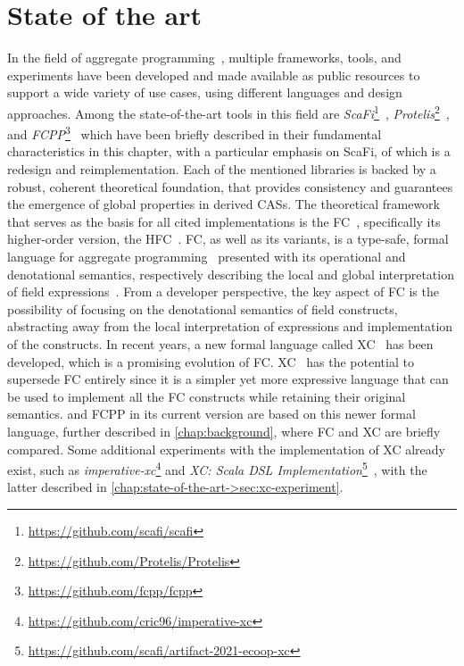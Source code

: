 \chapter{State of the art}
\label{chap:state-of-the-art}

In the field of aggregate programming~\cite{aggregate-programming}, multiple frameworks, tools, and experiments have been developed and made available as public resources to support a wide variety of use cases, using different languages and design approaches.
%
Among the state-of-the-art tools in this field are \textit{ScaFi}\footnote{\url{https://github.com/scafi/scafi}}~\cite{scafi}, \textit{Protelis}\footnote{\url{https://github.com/Protelis/Protelis}}~\cite{protelis}, and \textit{FCPP}\footnote{\url{https://github.com/fcpp/fcpp}}~\cite{fcpp} which have been briefly described in their fundamental characteristics in this chapter, with a particular emphasis on ScaFi, of which \this is a redesign and reimplementation.
%
Each of the mentioned libraries is backed by a robust, coherent theoretical foundation, that provides consistency and guarantees the emergence of global properties in derived \acp{CAS}.
%
The theoretical framework that serves as the basis for all cited implementations is the \ac{FC}~\cite{fc}, specifically its higher-order version, the \ac{HFC}~\cite{hofc}.
%
\ac{FC}, as well as its variants, is a type-safe, formal language for aggregate programming~\cite{fc, from-dc-to-fc-and-ap} presented with its operational and denotational semantics, respectively describing the local and global interpretation of field expressions~\cite{from-dc-to-fc-and-ap}.
%
From a developer perspective, the key aspect of \ac{FC} is the possibility of focusing on the denotational semantics of field constructs, abstracting away from the local interpretation of expressions and implementation of the constructs.
%
In recent years, a new formal language called \ac{XC}~\cite{xc} has been developed, which is a promising evolution of \ac{FC}.
%
\ac{XC}~\cite{xc} has the potential to supersede \ac{FC} entirely since it is a simpler yet more expressive language that can be used to implement all the \ac{FC} constructs while retaining their original semantics.
%
\this and FCPP in its current version are based on this newer formal language, further described in \cref{chap:background}, where \ac{FC} and \ac{XC} are briefly compared.
%
Some additional experiments with the implementation of \ac{XC} already exist, such as \textit{imperative-xc}\footnote{\url{https://github.com/cric96/imperative-xc}} and \textit{XC: Scala DSL Implementation}\footnote{\url{https://github.com/scafi/artifact-2021-ecoop-xc}}~\cite{xc-experiment-with-scafi}, with the latter described in \cref{chap:state-of-the-art->sec:xc-experiment}.

